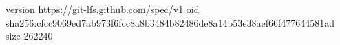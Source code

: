 version https://git-lfs.github.com/spec/v1
oid sha256:cfcc9069ed7ab973f6fcc8a8b3484b82486de8a14b53e38aef66f477644581ad
size 262240

